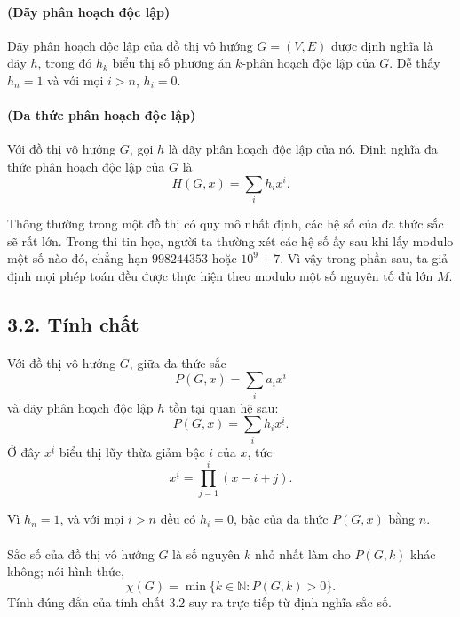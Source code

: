 \documentclass[11pt]{article}
\begin{document}
\paragraph{ (Dãy phân hoạch độc lập)}
Dãy phân hoạch độc lập của đồ thị vô hướng \(G=(V,E)\) được định nghĩa là dãy
\(h\), trong đó \(h_k\) biểu thị số phương án \(k\)-phân hoạch độc lập của
\(G\). Dễ thấy \(h_n=1\) và với mọi \(i>n\), \(h_i=0\).

\paragraph{ (Đa thức phân hoạch độc lập)}
Với đồ thị vô hướng \(G\), gọi \(h\) là dãy phân hoạch độc lập của nó. Định
nghĩa đa thức phân hoạch độc lập của \(G\) là
\[
  H(G,x)=\sum_i h_i x^i.
\]

Thông thường trong một đồ thị có quy mô nhất định, các hệ số của đa thức sắc
sẽ rất lớn. Trong thi tin học, người ta thường xét các hệ số ấy sau khi lấy
modulo một số nào đó, chẳng hạn \(998244353\) hoặc \(10^9+7\). Vì vậy trong
phần sau, ta giả định mọi phép toán đều được thực hiện theo modulo một số
nguyên tố đủ lớn \(M\).

\subsection*{3.2. Tính chất}

\paragraph{}
Với đồ thị vô hướng \(G\), giữa đa thức sắc
\[
  P(G,x)=\sum_i a_i x^i
\]
và dãy phân hoạch độc lập \(h\) tồn tại quan hệ sau:
\[
  P(G,x)=\sum_i h_i x^{\underline{i}}.
\]
Ở đây \(x^{\underline{i}}\) biểu thị lũy thừa giảm bậc \(i\) của \(x\), tức
\[
  x^{\underline{i}}=\prod_{j=1}^{i}(x-i+j).
\]

Vì \(h_n=1\), và với mọi \(i>n\) đều có \(h_i=0\), bậc của đa thức \(P(G,x)\)
bằng \(n\).

\paragraph{}
Sắc số của đồ thị vô hướng \(G\) là số nguyên \(k\) nhỏ nhất làm cho
\(P(G,k)\) khác không; nói hình thức,
\[
  \chi(G)=\min\{k\in\mathbb{N}: P(G,k)>0\}.
\]
Tính đúng đắn của tính chất 3.2 suy ra trực tiếp từ định nghĩa sắc số.
\end{document}
